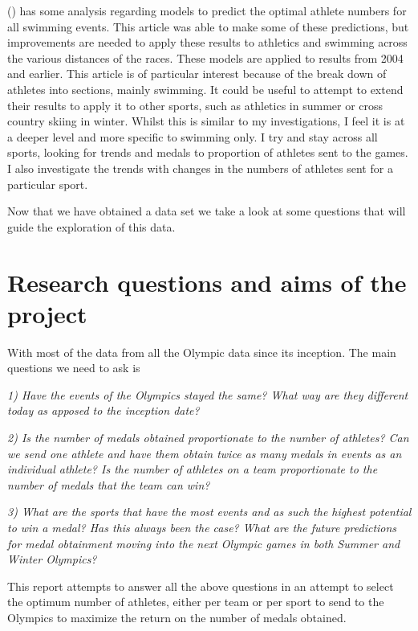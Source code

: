 \documentclass[
]{article}
\begin{document}
() has some analysis regarding models to predict the optimal athlete numbers for all swimming events. This article was able to make some of these predictions, but improvements are needed to apply these results to athletics and swimming across the various distances of the races. These models are applied to results from 2004 and earlier. This article is of particular interest because of the break down of athletes into sections, mainly swimming. It could be useful to attempt to extend their results to apply it to other sports, such as athletics in summer or cross country skiing in winter. Whilst this is similar to my investigations, I feel it is at a deeper level and more specific to swimming only. I try and stay across all sports, looking for trends and medals to proportion of athletes sent to the games. I also investigate the trends with changes in the numbers of athletes sent for a particular sport.

Now that we have obtained a data set we take a look at some questions that will guide the exploration of this data.

\newpage

\section*{Research questions and aims of the project}\label{research-questions-and-aims-of-the-project}

With most of the data from all the Olympic data since its inception. The main questions we need to ask is

\emph{1) Have the events of the Olympics stayed the same? What way are they different today as apposed to the inception date?}

\emph{2) Is the number of medals obtained proportionate to the number of athletes? Can we send one athlete and have them obtain twice as many medals in events as an individual athlete? Is the number of athletes on a team proportionate to the number of medals that the team can win?}

\emph{3) What are the sports that have the most events and as such the highest potential to win a medal? Has this always been the case? What are the future predictions for medal obtainment moving into the next Olympic games in both Summer and Winter Olympics?}

This report attempts to answer all the above questions in an attempt to select the optimum number of athletes, either per team or per sport to send to the Olympics to maximize the return on the number of medals obtained.
\end{document}
